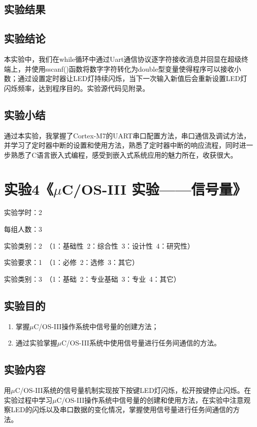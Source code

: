 ﻿\documentclass[UTF8,12pt]{article}
\begin{document}
\subsection{实验结果}

\subsection{实验结论}
本实验中，我们在while循环中通过Uart通信协议逐字符接收消息并回显在超级终端上，并使用sscanf()函数将数字字符转化为double型变量使得程序可以接收小数；通过设置定时器让LED灯持续闪烁，当下一次输入新值后会重新设置LED灯闪烁频率，达到程序目的。实验源代码见附录。

\subsection{实验小结}
通过本实验，我掌握了Cortex-M7的UART串口配置方法，串口通信及调试方法，并学习了定时器中断的设置和使用方法，熟悉了定时器中断的响应流程，同时进一步熟悉了C语言嵌入式编程，感受到嵌入式系统应用的魅力所在，收获很大。

\newpage

\section{实验4《$\mu$C/OS-III 实验——信号量》}

实验学时：2

每组人数：3

实验类别：2\ （1：基础性\ 2：综合性\ 3：设计性\ 4：研究性）

实验要求：1\ （1：必修\ 2：选修\ 3：其它）

实验类别：3\ （1：基础\ 2：专业基础\ 3：专业\ 4：其它）

\subsection{实验目的}
\begin{enumerate}
  \item 掌握$\mu$C/OS-III操作系统中信号量的创建方法；
  \item 通过实验掌握$\mu$C/OS-III系统中使用信号量进行任务间通信的方法。
\end{enumerate}

\subsection{实验内容}
用$\mu$C/OS-III系统的信号量机制实现按下按键LED灯闪烁，松开按键停止闪烁。在实验过程中学习$\mu$C/OS-III操作系统中信号量的创建和使用方法，在实验中注意观察LED的闪烁以及串口数据的变化情况，掌握使用信号量进行任务间通信的方法。
\end{document}
